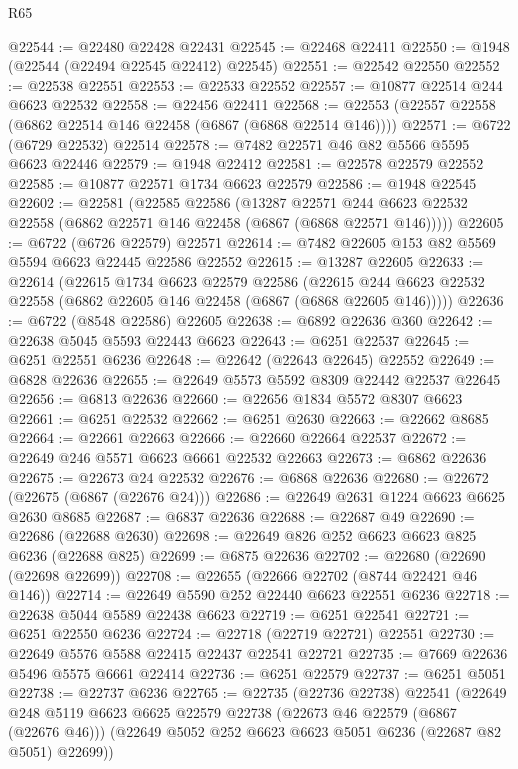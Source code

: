 \begin{lexlean}{R65}
\begin{coremodule}
{@22544 := @22480 @22428 @22431
@22545 := @22468 @22411
@22550 := @1948 (@22544 (@22494 @22545 @22412) @22545)
@22551 := @22542 @22550
@22552 := @22538 @22551
@22553 := @22533 @22552
@22557 := @10877 @22514 @244 @6623 @22532
@22558 := @22456 @22411
@22568 := @22553 (@22557 @22558 (@6862 @22514 @146 @22458 (@6867 (@6868 @22514 @146))))
@22571 := @6722 (@6729 @22532) @22514
@22578 := @7482 @22571 @46 @82 @5566 @5595 @6623 @22446
@22579 := @1948 @22412
@22581 := @22578 @22579 @22552
@22585 := @10877 @22571 @1734 @6623 @22579
@22586 := @1948 @22545
@22602 := @22581
    (@22585
      @22586
      (@13287
        @22571
        @244
        @6623
        @22532
        @22558
        (@6862 @22571 @146 @22458 (@6867 (@6868 @22571 @146)))))
@22605 := @6722 (@6726 @22579) @22571
@22614 := @7482 @22605 @153 @82 @5569 @5594 @6623 @22445 @22586 @22552
@22615 := @13287 @22605
@22633 := @22614
    (@22615
      @1734
      @6623
      @22579
      @22586
      (@22615 @244 @6623 @22532 @22558 (@6862 @22605 @146 @22458 (@6867 (@6868 @22605 @146)))))
@22636 := @6722 (@8548 @22586) @22605
@22638 := @6892 @22636 @360
@22642 := @22638 @5045 @5593 @22443 @6623
@22643 := @6251 @22537
@22645 := @6251 @22551 @6236
@22648 := @22642 (@22643 @22645) @22552
@22649 := @6828 @22636
@22655 := @22649 @5573 @5592 @8309 @22442 @22537 @22645
@22656 := @6813 @22636
@22660 := @22656 @1834 @5572 @8307 @6623
@22661 := @6251 @22532
@22662 := @6251 @2630
@22663 := @22662 @8685
@22664 := @22661 @22663
@22666 := @22660 @22664 @22537
@22672 := @22649 @246 @5571 @6623 @6661 @22532 @22663
@22673 := @6862 @22636
@22675 := @22673 @24 @22532
@22676 := @6868 @22636
@22680 := @22672 (@22675 (@6867 (@22676 @24)))
@22686 := @22649 @2631 @1224 @6623 @6625 @2630 @8685
@22687 := @6837 @22636
@22688 := @22687 @49
@22690 := @22686 (@22688 @2630)
@22698 := @22649 @826 @252 @6623 @6623 @825 @6236 (@22688 @825)
@22699 := @6875 @22636
@22702 := @22680 (@22690 (@22698 @22699))
@22708 := @22655 (@22666 @22702 (@8744 @22421 @46 @146))
@22714 := @22649 @5590 @252 @22440 @6623 @22551 @6236
@22718 := @22638 @5044 @5589 @22438 @6623
@22719 := @6251 @22541
@22721 := @6251 @22550 @6236
@22724 := @22718 (@22719 @22721) @22551
@22730 := @22649 @5576 @5588 @22415 @22437 @22541 @22721
@22735 := @7669 @22636 @5496 @5575 @6661 @22414
@22736 := @6251 @22579
@22737 := @6251 @5051
@22738 := @22737 @6236
@22765 := @22735
    (@22736 @22738)
    @22541
    (@22649
      @248
      @5119
      @6623
      @6625
      @22579
      @22738
      (@22673 @46 @22579 (@6867 (@22676 @46)))
      (@22649 @5052 @252 @6623 @6623 @5051 @6236 (@22687 @82 @5051) @22699))
}
\end{coremodule}
\end{lexlean}
